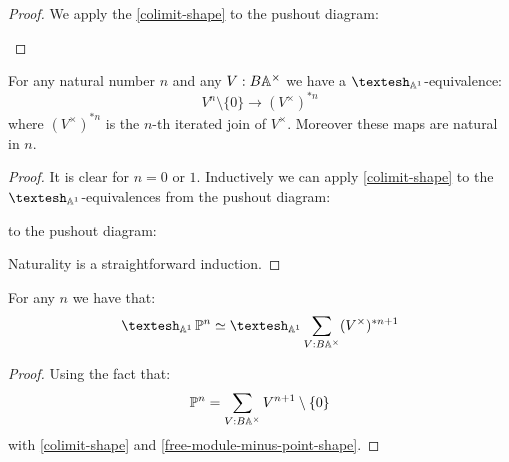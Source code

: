 \begin{proof}
We apply the \cref{colimit-shape} to the pushout diagram:
 \begin{center}
  \end{center}
  \end{proof}

\begin{lemma}\label{free-module-minus-point-shape}
For any natural number $n$ and any $V:B\mathbb{A}^\times$ we have a $\shape_{\A^1}$-equivalence:
\[V^{n}\setminus\{0\} \to (V^\times)^{*n}\]
where $(V^\times)^{*n}$ is the $n$-th iterated join of $V^\times$. Moreover these maps are natural in $n$.
\end{lemma}

\begin{proof}
It is clear for $n=0$ or $1$. Inductively we can apply \cref{colimit-shape} to the $\shape_{\A^1}$-equivalences from the pushout diagram:
 \begin{center}
  \end{center}
  to the pushout diagram:
   \begin{center}
  \end{center}
  Naturality is a straightforward induction.
\end{proof}

\begin{proposition}
For any $n$ we have that:
\[\shape_{\A^1} \bP^n \simeq \shape_{\A^1} \sum_{V:B\A^\times} (V^\times)^{*n+1}\]
\end{proposition}

\begin{proof}
Using the fact that:
\[\mathbb{P}^n = \sum_{V:B\mathbb{A}^\times} V^{n+1}\setminus\{0\}\]
with \cref{colimit-shape} and \cref{free-module-minus-point-shape}.
\end{proof}

